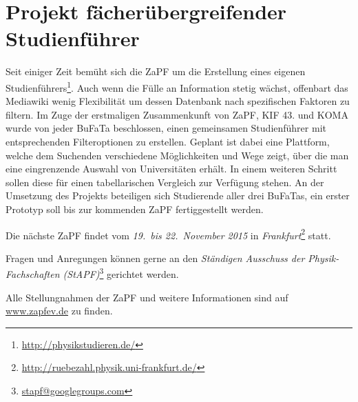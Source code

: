 \documentclass{scrartcl}
\begin{document}
\section*{Projekt fächerübergreifender Studienführer }

Seit einiger Zeit bemüht sich die ZaPF um die Erstellung eines eigenen
Studienführers\footnote{\href{http://physikstudieren.de/}{\url{http://physikstudieren.de/}}}.
Auch wenn die Fülle an Information stetig wächst, offenbart das Mediawiki wenig
Flexibilität um dessen Datenbank nach spezifischen Faktoren zu filtern.  Im
Zuge der erstmaligen Zusammenkunft von ZaPF, KIF 43. und KOMA wurde von jeder
BuFaTa beschlossen, einen gemeinsamen Studienführer mit entsprechenden
Filteroptionen zu erstellen. Geplant ist dabei eine Plattform, welche dem
Suchenden verschiedene Möglichkeiten und Wege zeigt, über die man eine
eingrenzende Auswahl von Universitäten erhält. In einem weiteren Schritt sollen
diese für einen tabellarischen Vergleich zur Verfügung stehen.  An der
Umsetzung des Projekts beteiligen sich Studierende aller drei BuFaTas, ein
erster Prototyp soll bis zur kommenden ZaPF fertiggestellt werden.


\vspace{0.5cm}
Die nächste ZaPF findet vom \emph{19.\ bis 22.\ November 2015} in \emph{Frankfurt}\footnote{\href{http://ruebezahl.physik.uni-frankfurt.de/}{\url{http://ruebezahl.physik.uni-frankfurt.de/}}} statt.

Fragen und Anregungen können gerne an den \emph{Ständigen Ausschuss der Physik-Fachschaften (StAPF)}\footnote{\href{mailto:stapf@googlegroups.com}{\url{stapf@googlegroups.com}}} gerichtet werden.

Alle Stellungnahmen der ZaPF und weitere Informationen sind auf \href{http://www.zapfev.de}{\url{www.zapfev.de}} zu finden.
\end{document}
